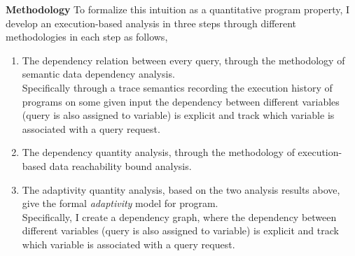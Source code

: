 \begin{itemize}
\textbf{Methodology}
To formalize this intuition as a quantitative program property, I develop an execution-based analysis
   in three steps through different methodologies in each step as follows,
   \begin{enumerate}
	\item The dependency relation between every query, through the methodology of semantic data dependency analysis.
    \\
    Specifically through a trace semantics recording the execution history of programs on some given input
     the dependency between different variables (query is also assigned to variable) is explicit and track which variable is associated with a query request. 
   \item The dependency quantity analysis, through the methodology of execution-based data reachability bound analysis.
	\item The adaptivity quantity analysis, based on the two analysis results above, give the formal \emph{adaptivity} model 
   for program.
   \\
   Specifically, I create a dependency graph, where the dependency between different variables (query is also assigned to variable) is explicit and track which variable is associated with a query request. 

\end{enumerate}
\end{itemize}

